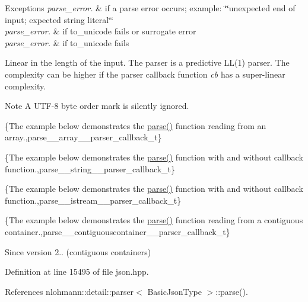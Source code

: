 \begin{DoxyExceptions}{Exceptions}
{\em parse\+\_\+error.} & if a parse error occurs; example\+: {\ttfamily \char`\"{}\char`\"{}unexpected end of input; expected string literal\char`\"{}\char`\"{}} \\
\hline
{\em parse\+\_\+error.} & if to\+\_\+unicode fails or surrogate error \\
\hline
{\em parse\+\_\+error.} & if to\+\_\+unicode fails\\
\hline
\end{DoxyExceptions}
Linear in the length of the input. The parser is a predictive L\+L(1) parser. The complexity can be higher if the parser callback function {\itshape cb} has a super-\/linear complexity.

\begin{DoxyNote}{Note}
A U\+T\+F-\/8 byte order mark is silently ignored.
\end{DoxyNote}
\{The example below demonstrates the {\ttfamily \hyperlink{classnlohmann_1_1basic__json_aa9676414f2e36383c4b181fe856aa3c0}{parse()}} function reading from an array.,parse\+\_\+\+\_\+array\+\_\+\+\_\+parser\+\_\+callback\+\_\+t\}

\{The example below demonstrates the {\ttfamily \hyperlink{classnlohmann_1_1basic__json_aa9676414f2e36383c4b181fe856aa3c0}{parse()}} function with and without callback function.,parse\+\_\+\+\_\+string\+\_\+\+\_\+parser\+\_\+callback\+\_\+t\}

\{The example below demonstrates the {\ttfamily \hyperlink{classnlohmann_1_1basic__json_aa9676414f2e36383c4b181fe856aa3c0}{parse()}} function with and without callback function.,parse\+\_\+\+\_\+istream\+\_\+\+\_\+parser\+\_\+callback\+\_\+t\}

\{The example below demonstrates the {\ttfamily \hyperlink{classnlohmann_1_1basic__json_aa9676414f2e36383c4b181fe856aa3c0}{parse()}} function reading from a contiguous container.,parse\+\_\+\+\_\+contiguouscontainer\+\_\+\+\_\+parser\+\_\+callback\+\_\+t\}

\begin{DoxySince}{Since}
version 2.. (contiguous containers) 
\end{DoxySince}


Definition at line 15495 of file json.\+hpp.



References nlohmann\+::detail\+::parser$<$ Basic\+Json\+Type $>$\+::parse().



